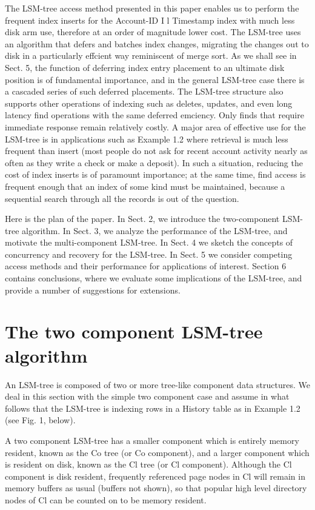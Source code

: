 \documentclass[a4paper,11pt,notitlepage,twoside,openright]{article}
\begin{document}
The LSM-tree access method presented in this paper enables us to perform
the frequent index inserts for the Account-ID I l Timestamp index with
much less disk arm use, therefore at an order of magnitude lower cost.
The LSM-tree uses an algorithm that defers and batches index changes,
migrating the changes out to disk in a particularly effcient way
reminiscent of merge sort. As we shall see in Sect. 5, the function of
deferring index entry placement to an ultimate disk position is of
fundamental importance, and in the general LSM-tree case there is a
cascaded series of such deferred placements. The LSM-tree structure also
supports other operations of indexing such as deletes, updates, and even
long latency find operations with the same deferred emciency. Only finds
that require immediate response remain relatively costly. A major area
of effective use for the LSM-tree is in applications such as Example 1.2
where retrieval is much less frequent than insert (most people do not
ask for recent account activity nearly as often as they write a check or
make a deposit). In such a situation, reducing the cost of index inserts
is of paramount importance; at the same time, find access is frequent
enough that an index of some kind must be maintained, because a
sequential search through all the records is out of the question.

Here is the plan of the paper. In Sect. 2, we introduce the
two-component LSM-tree algorithm. In Sect. 3, we analyze the performance
of the LSM-tree, and motivate the multi-component LSM-tree. In Sect. 4
we sketch the concepts of concurrency and recovery for the LSM-tree. In
Sect. 5 we consider competing access methods and their performance for
applications of interest. Section 6 contains conclusions, where we
evaluate some implications of the LSM-tree, and provide a number of
suggestions for extensions.


\hypertarget{the-two-component-lsm-tree-algorithm}{%
\section{The two component LSM-tree
algorithm}\label{the-two-component-lsm-tree-algorithm}}


An LSM-tree is composed of two or more tree-like component data
structures. We deal in this section with the simple two component case
and assume in what follows that the LSM-tree is indexing rows in a
History table as in Example 1.2 (see Fig. 1, below).

A two component LSM-tree has a smaller component which is entirely
memory resident, known as the Co tree (or Co component), and a larger
component which is resident on disk, known as the Cl tree (or Cl
component). Although the Cl component is disk resident, frequently
referenced page nodes in Cl will remain in memory buffers as usual
(buffers not shown), so that popular high level directory nodes of Cl
can be counted on to be memory resident.
\end{document}
